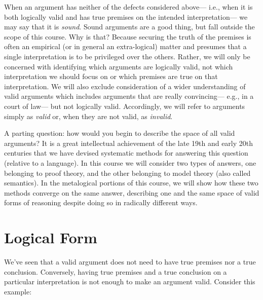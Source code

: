 When an argument has neither of the defects considered above--- i.e., when it is both logically valid and has true premises on the intended interpretation--- we may say that it is \textit{sound}. %
Sound arguments are a good thing, but fall outside the scope of this course.
Why is that?
Because securing the truth of the premises is often an empirical (or in general an extra-logical) matter and presumes that a single interpretation is to be privileged over the others.
Rather, we will only be concerned with identifying which arguments are logically valid, not which interpretation we should focus on or which premises are true on that interpretation.
We will also exclude consideration of a wider understanding of valid arguments which includes arguments that are really convincing--- e.g., in a court of law--- but not logically valid.
Accordingly, we will refer to arguments simply as \textit{valid} or, when they are not valid, as \textit{invalid}.

A parting question: how would you begin to describe the space of all valid arguments? 
It is a great intellectual achievement of the late 19th and early 20th centuries that we have devised systematic methods for answering this question (relative to a language).
In this course we will consider two types of answers, one belonging to proof theory, and the other belonging to model theory (also called semantics).
In the metalogical portions of this course, we will show how these two methods converge on the same answer, describing one and the same space of valid forms of reasoning despite doing so in radically different ways.





\section{Logical Form}
\label{sec:LogicalForm}

We've seen that a valid argument does not need to have true premises nor a true conclusion.
Conversely, having true premises and a true conclusion on a particular interpretation is not enough to make an argument valid.
Consider this example:

